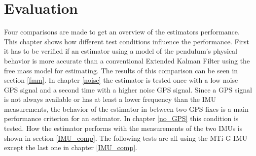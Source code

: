 \section{Evaluation}\label{evaluation}
Four comparisons are made to get an overview of the estimators performance. This chapter shows how different test conditions influence the performance. First it has to be verified if an estimator using a model of the pendulum's physical behavior is more accurate than a conventional Extended Kalman Filter using the free mass model for estimating. The results of this comparison can be seen in section \ref{fmm}. In chapter \ref{noise} the estimator is tested once with a low noise GPS signal and a second time with a higher noise GPS signal. Since a GPS signal is not always available or has at least a lower frequency than the IMU measurements, the behavior of the estimator in between two GPS fixes is a main performance criterion for an estimator. In chapter \ref{no_GPS} this condition is tested. How the estimator performs with the measurements of the two IMUs is shown in section \ref{IMU_comp}. The following tests are all using the MTi-G IMU except the last one in chapter \ref{IMU_comp}.

\FloatBarrier

